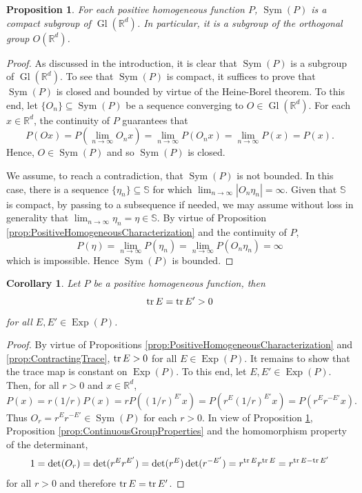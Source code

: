 \documentclass[11pt]{article}
\newtheorem{corollary}[theorem]{Corollary}
\newtheorem{proposition}[theorem]{Proposition}
\theoremstyle{remark}
\newcommand\Gl{\operatorname{Gl}} %
\newcommand\Sym{\operatorname{Sym}}
\newcommand\Exp{\operatorname{Exp}}
\renewcommand\det{\operatorname{det}}
\begin{document}
\begin{proposition}\label{prop:SymCompact}
For each positive homogeneous function $P$, $\Sym(P)$ is a compact subgroup of $\Gl(\mathbb{R}^d)$. In particular, it is a subgroup of the orthogonal group $O(\mathbb{R}^d)$.
\end{proposition}
\begin{proof}
As discussed in the introduction, it is clear that $\Sym(P)$ is a subgroup of $\Gl(\mathbb{R}^d)$. To see that $\Sym(P)$ is compact, it suffices to prove that $\Sym(P)$ is closed and bounded by virtue of the Heine-Borel theorem. To this end, let $\{O_n\}\subseteq\Sym(P)$ be a sequence converging to $O\in \Gl(\mathbb{R}^d)$. For each $x\in\mathbb{R}^d$, the continuity of $P$ guarantees that
\begin{equation*}
P(Ox)=P\left(\lim_{n\to\infty}O_nx\right)=\lim_{n\to\infty}P(O_nx)=\lim_{n\to\infty}P(x)=P(x).
\end{equation*}
Hence, $O\in\Sym(P)$ and so $\Sym(P)$ is closed.

We assume, to reach a contradiction, that $\Sym(P)$ is not bounded. In this case, there is a sequence $\{\eta_n\}\subseteq \mathbb{S}$ for which $\lim_{n\to\infty}|O_n\eta_n|=\infty$. Given that $\mathbb{S}$ is compact, by passing to a subsequence if needed, we may assume without loss in generality that $\lim_{n\to\infty}\eta_n=\eta\in\mathbb{S}$. By virtue of Proposition \ref{prop:PositiveHomogeneousCharacterization} and the continuity of $P$,
\begin{equation*}
P(\eta)=\lim_{n\to\infty}P(\eta_n)=\lim_{n\to\infty}P(O_n\eta_n)=\infty
\end{equation*}
which is impossible. Hence $\Sym(P)$ is bounded.
\end{proof}

\begin{corollary}\label{cor:TraceisInvariant}
Let $P$ be a positive homogeneous function, then
\begin{equation*}
\tr E=\tr E'>0
\end{equation*}
for all $E,E'\in\Exp(P)$.
\end{corollary}
\begin{proof}
By virtue of Propositions \ref{prop:PositiveHomogeneousCharacterization} and \ref{prop:ContractingTrace}, $\tr E>0$ for all $E\in\Exp(P)$. It remains to show that the trace map is constant on $\Exp(P)$. To this end, let $E,E'\in\Exp(P)$. Then, for all $r>0$ and $x\in\mathbb{R}^d$,
\begin{equation*}
P(x)=r(1/r)P(x)=rP((1/r)^{E'}x)=P(r^E(1/r)^{E'}x)=P(r^{E}r^{-E'}x).
\end{equation*}
Thus $O_r=r^{E}r^{-E'}\in\Sym(P)$ for each $r>0$. In view of Proposition \ref{prop:SymCompact}, Proposition \ref{prop:ContinuousGroupProperties} and the homomorphism property of the determinant,
\begin{equation*}
1=\det(O_r)=\det(r^{E}r^{E'})=\det(r^{E})\det(r^{-E'})=r^{\tr E}r^{\tr E}=r^{\tr E-\tr E'}
\end{equation*}
for all $r>0$ and therefore $\tr E=\tr E'$.
\end{proof}
\end{document}
